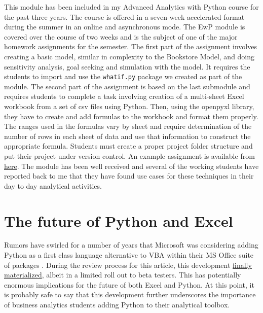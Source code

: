 \documentclass[ited]{informs3}                      %
\newcommand{\code}[1]{\texttt{#1}}
\begin{document}
This module has been included in my Advanced Analytics with Python course for the past three years. The course is offered in a seven-week accelerated format during the summer in an online and asynchronous mode. The EwP module is covered over the course of two weeks and is the subject of one of the major homework assignments for the semester. The first part of the assignment involves creating a basic model, similar in complexity to the Bookstore Model, and doing sensitivity analysis, goal seeking and simulation with the model. It requires the students to import and use the \code{whatif.py} package we created as part of the module. The second part of the assignment is based on the last submodule and requires  students to complete a task involving creation of a multi-sheet Excel workbook from a set of csv files using Python. Then, using the openpyxl library, they have to create and add formulas to the workbook and format them properly. The ranges used in the formulas vary by sheet and require determination of the number of rows in each sheet of data and use that information to construct the appropriate formula. Students must create a proper project folder structure and put their project under version control. An example assignment is available from \href{https://drive.google.com/file/d/1prf8acZXZ4RoYBgQ8e9-eijA65uV7T-V/view?usp=sharing}{here}. The module has been well received and several of the working students have reported back to me that they have found use cases for these techniques in their day to day analytical activities.


\section{The future of Python and Excel}
\label{sec:future}

Rumors have swirled for a number of years that Microsoft was considering adding Python as a first class language alternative to VBA within their MS Office suite of packages \cite{cimpanuMicrosoftConsidersAdding2017}. During the review process for this article, this development \href{https://techcommunity.microsoft.com/t5/excel-blog/announcing-python-in-excel-combining-the-power-of-python-and-the/ba-p/3893439}{finally materialized}, albeit in a limited roll out to beta testers. This has potentially enormous implications for the future of both Excel and Python. At this point, it is probably safe to say that this development further underscores the importance of business analytics students adding Python to their analytical toolbox. 
\end{document}
